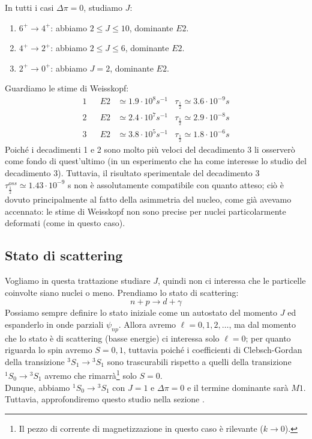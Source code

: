 \noindent In tutti i casi $\Delta\pi =0 $, studiamo $J$:
\begin{enumerate}[1.]
    \item $6^+\to4^+$: abbiamo $2\leq J \leq 10$, dominante $E2$.
    \item $4^+\to2^+$: abbiamo $2\leq J \leq 6$, dominante $E2$.
    \item $2^+\to0^+$: abbiamo $J=2$, dominante $E2$.
\end{enumerate}
Guardiamo le stime di Weisskopf:
\begin{displaymath}
\begin{aligned}
1& & E2&\simeq 1.9 \cdot 10^8 \unit{s}^{-1} & \tau_{\frac{1}{2}} \simeq 3.6 \cdot 10^{-9} \unit{s} \\
2& & E2&\simeq 2.4 \cdot 10^7 \unit{s}^{-1} & \tau_{\frac{1}{2}} \simeq 2.9 \cdot 10^{-8} \unit{s} \\
3& & E2&\simeq 3.8 \cdot 10^5 \unit{s}^{-1} & \tau_{\frac{1}{2}} \simeq 1.8 \cdot 10^{-6} \unit{s} 
\end{aligned}
\end{displaymath}
Poiché i decadimenti 1 e 2 sono molto più veloci del decadimento 3 li osserverò come fondo di quest'ultimo (in un esperimento che ha come interesse lo studio del decadimento 3). Tuttavia, il risultato sperimentale del decadimento 3 $\tau_{\frac{1}{2}}^{oss}\simeq 1.43\cdot10^{-9}$ s non è assolutamente compatibile con quanto atteso; ciò è dovuto principalmente al fatto della asimmetria del nucleo, come già avevamo accennato: le stime di Weisskopf non sono precise per nuclei particolarmente deformati (come in questo caso).

\subsection{Stato di scattering}
Vogliamo in questa trattazione studiare $J$, quindi non ci interessa che le particelle coinvolte siano nuclei o meno. Prendiamo lo stato di scattering:
$$n+p \to d + \gamma$$
Possiamo sempre definire lo stato iniziale come un autostato del momento $J$ ed espanderlo in onde parziali $\psi_{np}$. Allora avremo $\ell = 0,1,2,\dots$, ma dal momento che lo stato è di scattering (basse energie) ci interessa solo $\ell=0$; per quanto riguarda lo spin avremo $S=0,1$, tuttavia poiché i coefficienti di Clebsch-Gordan della transizione ${^3S_1}\to {^3S_1}$ sono trascurabili rispetto a quelli della transizione ${^1S_0}\to {^3S_1}$ avremo che rimarrà\footnote{Il pezzo di corrente di magnetizzazione in questo caso è rilevante ($k\to0$).} solo $S=0$.\\
Dunque, abbiamo ${^1S_0}\to {^3S_1}$ con $J=1$ e $\Delta\pi  = 0$ e il termine dominante sarà $M1$.\\
Tuttavia, approfondiremo questo studio nella sezione .
